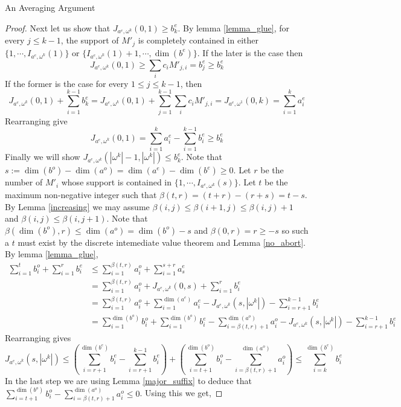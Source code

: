 \documentclass[11pt,a4paper]{article}
\begin{document}
\begin{section}{An Averaging Argument}
\begin{proof}
\medskip
Next let us show that $J_{a^e, \omega^k} (0, 1) \geq b^e_k$. By lemma \ref{lemma_glue}, for every $j \leq k - 1$, the support of $M'_j$ is completely contained in either $\{1, \cdots , I_{a^e, \omega^k} ( 1) \}$ or $\{ I_{a^e, \omega^k} (1) +1, \cdots, \dim(b^e) \}$. If the later is the case then
\[
J_{a^e, \omega ^k} (0, 1) \geq \sum_{i} c_i M'_{j,i} = b^e_j \geq b^e_k
\]
If the former is the case for every $1\leq j \leq k - 1$, then
\[
J_{a^e, \omega^k} (0, 1) + \sum_{i = 1}^{k - 1} b^e_k = J_{a^e, \omega^k} (0, 1) + \sum_{j = 1}^{k - 1} \sum_i c_i M'_{j, i} = J_{a^e, \omega^1} (0, k) = \sum_{i = 1}^k a^e_i
\]
Rearranging give
\[
J_{a^e, \omega^k}(0, 1) = \sum_{i = 1}^{k} a^e_i - \sum_{i = 1}^{k - 1} b^e_i \geq b^e_k
\]
Finally we will show $J_{a^e, \omega^k } ( |\omega^k| - 1, |\omega^k| ) \leq b^e_k$. Note that $s := \dim(b^o) - \dim(a^o) = \dim(a^e) - \dim(b^e) \geq 0$. Let $r$ be the number of $M'_i$ whose support is contained in $\{1, \cdots, I_{a^e, \omega^k} (s) \}$. Let $t$ be the maximum non-negative integer such that $\beta(t, r) = (t + r) - (r + s) = t - s$. By Lemma \ref{increasing} we may assume $\beta(i, j) \leq \beta(i + 1, j) \leq \beta(i, j) + 1$ and $\beta(i, j) \leq \beta(i, j + 1)$. Note that $\beta(\dim(b^o), r) \leq \dim(a^o) =\dim(b^o) - s$ and $\beta(0, r) = r \geq -s$ so such a $t$ must exist by the discrete intemediate value theorem and Lemma \ref{no_abort}. By lemma \ref{lemma_glue},
\begin{align}
\sum_{i = 1}^{t} b^o_i + \sum_{i = 1}^{r} b^e_i & \leq \sum_{i = 1}^{ \beta(t, r) } a^o_i + \sum_{i = 1}^{s + r} a^e_s\\
& = \sum_{i = 1}^{\beta(t, r)} a^o_i + J_{a^e, \omega^k} (0, s) + \sum_{i = 1}^r b^e_i \\
&= \sum_{i = 1}^{\beta(t, r)} a^o_i + \sum_{i = 1}^{\dim(a^e)} a^e_i - J_{a^e, \omega^k} (s, |\omega^k| ) - \sum_{i = r + 1}^{k - 1} b^e_i\\
& = \sum_{i = 1}^{\dim(b^o)} b^o_i + \sum_{i = 1}^{\dim(b^o)} b^e_i - \sum_{i = \beta(t, r) + 1}^{\dim(a^o)} a^o_i - J_{a^e, \omega^k} (s, |\omega^k| ) - \sum_{i = r + 1}^{k - 1} b^e_i
\end{align}
Rearranging gives
\[
J_{a^e, \omega^k} (s, |\omega^k| ) \leq \left ( \sum_{i = r + 1}^{\dim (b^e)} b^e_i - \sum_{i = r + 1}^{k - 1} b^e_i \right ) + \left ( \sum_{i = t + 1}^{\dim(b^o)} b^o_i - \sum_{i = \beta(t, r) + 1}^{\dim(a^o)} a^o_i \right ) \leq \sum_{i = k }^{\dim(b^e)} b^e_i
\]
In the last step we are using Lemma \ref{major_suffix} to deduce that $ \sum_{i = t + 1}^{\dim(b^o)} b^o_i - \sum_{i = \beta(t, r) + 1}^{\dim(a^o)} a^o_i \leq 0$. Using this we get,

\end{proof}
\end{section}
\end{document}

